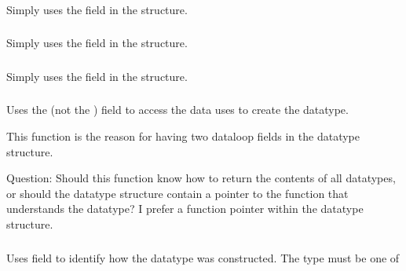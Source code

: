\documentclass{article}
\begin{document}
\subsubsection{}
Simply uses the  field in the structure.

\subsubsection{}
Simply uses the  field in the structure.

\subsubsection{}
Simply uses the  field in the structure.

\subsubsection{}
Uses the  (not the
) field to access the data uses to
create the datatype. 

This function is the reason for having two dataloop fields in the
datatype structure.  

Question: Should this function know how to return the contents of all
datatypes, or should the datatype structure contain a pointer to the
function that understands the datatype?  
I prefer a function pointer
within the datatype structure.



\subsubsection{}
Uses  field to identify how the datatype was constructed.
The  type must be one of 
\end{document}
